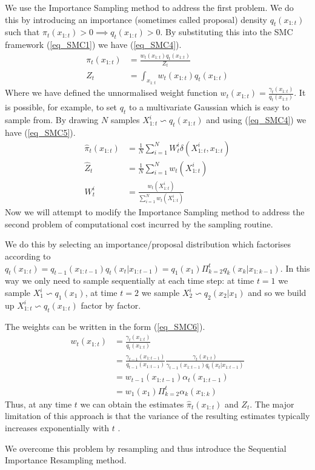 \documentclass[../masters.tex]{subfiles}
\begin{document}
We use the Importance Sampling method to address the first problem. We do this by introducing an importance (sometimes called proposal) density $q_t(x_{1:t})$ such that $\pi_t(x_{1:t}) > 0 \implies q_t(x_{1:t}) > 0$. By substituting this into the SMC framework (\ref{eq_SMC1}) we have (\ref{eq_SMC4}).
\begin{equation}
\begin{aligned}
\pi_t(x_{1:t}) &= \frac{w_t(x_{1:t})q_t(x_{1:t})}{Z_t} \\
Z_t &= \int_{x_{1:t}} w_t(x_{1:t})q_t(x_{1:t})
\end{aligned}
\label{eq_SMC4}
\end{equation} 
Where we have defined the unnormalised weight function $w_t(x_{1:t}) = \frac{\gamma_t(x_{1:t})}{q_t(x_{1:t})}$. It is possible, for example, to set $q_t$ to a multivariate Gaussian which is easy to sample from. By drawing $N$ samples $X_{1:t}^i \backsim q_t(x_{1:t})$ and using (\ref{eq_SMC4}) we have (\ref{eq_SMC5}). 
\begin{equation}
\begin{aligned}
\hat{\pi}_t(x_{1:t}) &= \frac{1}{N}\sum_{i=1}^N W_t^i\delta(X^i_{1:t}, x_{1:t}) \\
\hat{Z}_t &= \frac{1}{N}\sum_{i=1}^N w_t(X^i_{1:t}) \\
W^i_t &= \frac{w_t(X^i_{1:t})}{\sum_{i=1}^N w_t(X^i_{1:t})}
\end{aligned}
\label{eq_SMC5}
\end{equation}
Now we will attempt to modify the Importance Sampling method to address the second problem of computational cost incurred by the sampling routine. 

We do this by selecting an importance/proposal distribution which factorises according to $q_t(x_{1:t}) = q_{t-1}(x_{1:t-1})q_t(x_{t}|x_{1:t-1}) = q_1(x_1) \Pi_{k=2}^t q_k(x_k|x_{1:k-1})$. In this way we only need to sample sequentially at each time step: at time $t=1$ we sample $X_1^i \backsim q_1(x_1)$, at time $t=2$ we sample $X_{2}^i \backsim q_2(x_2|x_1)$ and so we build up $X^i_{1:t} \backsim q_t(x_{1:t})$ factor by factor.

The weights can be written in the form (\ref{eq_SMC6}).
\begin{equation}
\begin{aligned}
w_t(x_{1:t}) &= \frac{\gamma_t(x_{1:t})}{q_t(x_{1:t})} \\
&= \frac{\gamma_{t-1}(x_{1:t-1})}{q_{t-1}(x_{1:t-1})}\frac{\gamma_t(x_{1:t})}{\gamma_{t-1}(x_{1:t-1})q_t(x_t|x_{1:t-1})} \\
&= w_{t-1}(x_{1:t-1})\alpha_t(x_{1:t-1}) \\
&= w_1(x_1)\Pi_{k=2}^t \alpha_k(x_{1:k})
\end{aligned}
\label{eq_SMC6}
\end{equation}
Thus, at any time $t$ we can obtain the estimates $\hat{\pi}_t(x_{1:t})$ and $Z_t$. The major limitation of this approach is that the variance of the resulting estimates typically increases exponentially with $t$ \cite{pftut}. 

We overcome this problem by resampling and thus introduce the Sequential Importance Resampling method. 



\end{document}

